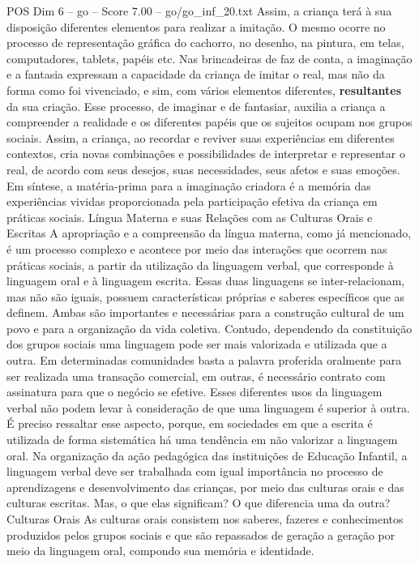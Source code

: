 \begin{textsample}{POS Dim 6 – go – Score 7.00 – go/go\_inf\_20.txt}
Assim, a criança terá à sua disposição diferentes elementos para realizar a imitação.
O mesmo ocorre no processo de representação gráfica do cachorro, no desenho, na pintura, em telas, computadores, tablets, papéis etc.
Nas brincadeiras de faz de conta, a imaginação e a fantasia expressam a capacidade da criança de imitar o real, mas não da forma como foi vivenciado, e sim, com vários elementos diferentes, \textbf{resultantes} da sua criação.
Esse processo, de imaginar e de fantasiar, auxilia a criança a compreender a realidade e os diferentes papéis que os sujeitos ocupam nos grupos sociais.
Assim, a criança, ao recordar e reviver suas experiências em diferentes contextos, cria novas combinações e possibilidades de interpretar e representar o real, de acordo com seus desejos, suas necessidades, seus afetos e suas emoções.
Em síntese, a matéria-prima para a imaginação criadora é a memória das experiências vividas proporcionada pela participação efetiva da criança em práticas sociais.
Língua Materna e suas Relações com as Culturas Orais e Escritas A apropriação e a compreensão da língua materna, como já mencionado, é um processo complexo e acontece por meio das interações que ocorrem nas práticas sociais, a partir da utilização da linguagem verbal, que corresponde à linguagem oral e à linguagem escrita.
Essas duas linguagens se inter-relacionam, mas não são iguais, possuem características próprias e saberes específicos que as definem.
Ambas são importantes e necessárias para a construção cultural de um povo e para a organização da vida coletiva.
Contudo, dependendo da constituição dos grupos sociais uma linguagem pode ser mais valorizada e utilizada que a outra.
Em determinadas comunidades basta a palavra proferida oralmente para ser realizada uma transação comercial, em outras, é necessário contrato com assinatura para que o negócio se efetive.
Esses diferentes usos da linguagem verbal não podem levar à consideração de que uma linguagem é superior à outra.
É preciso ressaltar esse aspecto, porque, em sociedades em que a escrita é utilizada de forma sistemática há uma tendência em não valorizar a linguagem oral.
Na organização da ação pedagógica das instituições de Educação Infantil, a linguagem verbal deve ser trabalhada com igual importância no processo de aprendizagens e desenvolvimento das crianças, por meio das culturas orais e das culturas escritas.
Mas, o que elas significam?
O que diferencia uma da outra?
Culturas Orais As culturas orais consistem nos saberes, fazeres e conhecimentos produzidos pelos grupos sociais e que são repassados de geração a geração por meio da linguagem oral, compondo sua memória e identidade.

\end{textsample}
